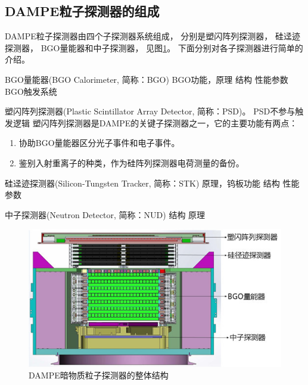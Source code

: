 \subsection{DAMPE粒子探测器的组成}
DAMPE粒子探测器由四个子探测器系统组成， 分别是塑闪阵列探测器， 硅迳迹探测器， BGO量能器和中子探测器， 见图\ref{fig:dampe_structure}。
下面分别对各子探测器进行简单的介绍。

BGO量能器(BGO Calorimeter, 简称：BGO)
BGO功能，原理
结构
性能参数
BGO触发系统

塑闪阵列探测器(Plastic Scintillator Array Detector, 简称：PSD)。
PSD不参与触发逻辑
塑闪阵列探测器是DAMPE的关键子探测器之一，它的主要功能有两点：
\begin{enumerate}
	\item 协助BGO量能器区分光子事件和电子事件。
	\item 鉴别入射重离子的种类，作为硅阵列探测器电荷测量的备份。
\end{enumerate}

硅迳迹探测器(Silicon-Tungsten Tracker, 简称：STK)
原理，钨板功能
结构
性能参数

中子探测器(Neutron Detector, 简称：NUD)
结构
原理

\begin{figure}
\centering
\includegraphics[width=0.8\linewidth]{chap/introduction/fig/dampe_structure_2}
\caption{DAMPE暗物质粒子探测器的整体结构}
\label{fig:dampe_structure}
\end{figure}
